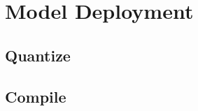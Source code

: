 \section{Model Deployment}
\label{sec:embedded_platform:model_deployment}

\subsection{Quantize}
\label{subsec:embedded_platform:model_deployment:quantize}

\subsection{Compile}
\label{subsec:embedded_platform:model_deployment:compile}
